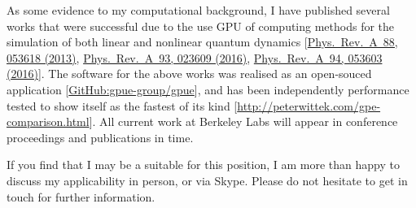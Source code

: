 \documentclass[11pt,a4paper,unicode]{moderncv}
\begin{document}
{    %

    As some evidence to my computational background, I have published several works that were successful due to the use GPU of computing methods for the simulation of both linear and nonlinear quantum dynamics [\href{http://journals.aps.org/pra/abstract/10.1103/PhysRevA.88.053618}{Phys.~Rev.~A~88, 053618 (2013)}, \href{https://journals.aps.org/pra/abstract/10.1103/PhysRevA.93.023609}{Phys.~Rev.~A~93, 023609 (2016)}, \href{https://journals.aps.org/pra/abstract/10.1103/PhysRevA.94.053603}{Phys.~Rev.~A~94, 053603 (2016)}]. The software for the above works was realised as an open-souced application [\href{https://github.com/gpue-group/gpue}{GitHub:gpue-group/gpue}], and has been independently performance tested to show itself as the fastest of its kind [\href{http://peterwittek.com/gpe-comparison.html}{http://peterwittek.com/gpe-comparison.html}]. All current work at Berkeley Labs will appear in conference proceedings and publications in time.

    If you find that I may be a suitable for this position, I am more than happy to discuss my applicability in person, or via Skype. Please do not hesitate to get in touch for further information.
    \vspace{-0.15cm}
}

\makeletterclosing
\end{document}
